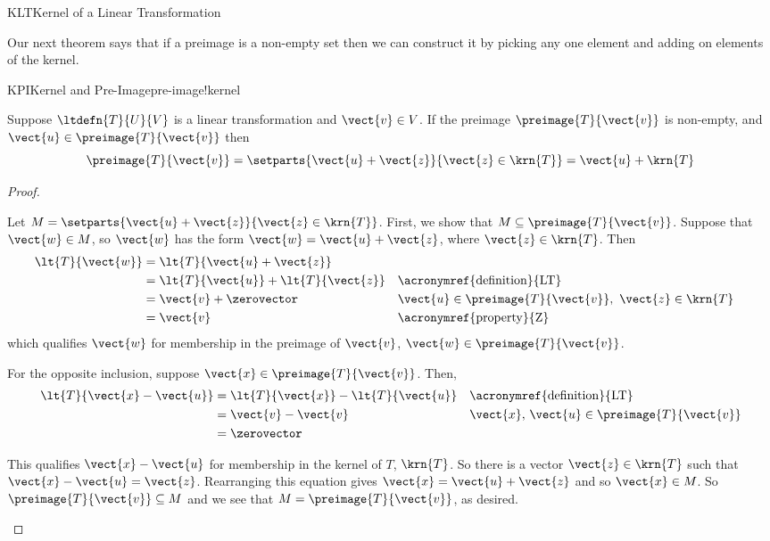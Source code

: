 \begin{subsect}{KLT}{Kernel of a Linear Transformation}
%
%
%
\begin{para}Our next theorem says that if a preimage is a non-empty set then we can construct it by picking any one element and adding on elements of the kernel.\end{para}
%
\begin{theorem}{KPI}{Kernel and Pre-Image}{pre-image!kernel}
\begin{para}Suppose $\ltdefn{T}{U}{V}$ is a linear transformation and $\vect{v}\in V$.  If the preimage $\preimage{T}{\vect{v}}$ is non-empty, and $\vect{u}\in\preimage{T}{\vect{v}}$  then
%
\begin{equation*}
\preimage{T}{\vect{v}}=
\setparts{\vect{u}+\vect{z}}{\vect{z}\in\krn{T}}
=\vect{u}+\krn{T}
\end{equation*}
\end{para}
%
\end{theorem}
%
\begin{proof}
\begin{para}Let $M=\setparts{\vect{u}+\vect{z}}{\vect{z}\in\krn{T}}$.  First, we show that $M\subseteq\preimage{T}{\vect{v}}$.  Suppose that $\vect{w}\in M$, so $\vect{w}$ has the form $\vect{w}=\vect{u}+\vect{z}$, where $\vect{z}\in\krn{T}$.  Then
%
\begin{align*}
\lt{T}{\vect{w}}&=\lt{T}{\vect{u}+\vect{z}}\\
&=\lt{T}{\vect{u}}+\lt{T}{\vect{z}}&&\text{\acronymref{definition}{LT}}\\
&=\vect{v}+\zerovector&&\vect{u}\in\preimage{T}{\vect{v}},\ \vect{z}\in\krn{T}\\
&=\vect{v}&&\text{\acronymref{property}{Z}}
\end{align*}
%
which qualifies $\vect{w}$ for membership in the preimage of $\vect{v}$, $\vect{w}\in\preimage{T}{\vect{v}}$.\end{para}
%
\begin{para}For the opposite inclusion, suppose $\vect{x}\in\preimage{T}{\vect{v}}$.  Then,
%
\begin{align*}
\lt{T}{\vect{x}-\vect{u}}&=\lt{T}{\vect{x}}-\lt{T}{\vect{u}}&&\text{\acronymref{definition}{LT}}\\
&=\vect{v}-\vect{v}&&\vect{x},\,\vect{u}\in\preimage{T}{\vect{v}}\\
&=\zerovector
\end{align*}
\end{para}
%
\begin{para}This qualifies $\vect{x}-\vect{u}$ for membership in the kernel of $T$, $\krn{T}$.  So there is a vector $\vect{z}\in\krn{T}$ such that $\vect{x}-\vect{u}=\vect{z}$.  Rearranging this equation gives $\vect{x}=\vect{u}+\vect{z}$ and so $\vect{x}\in M$.  So $\preimage{T}{\vect{v}}\subseteq M$ and we see that $M=\preimage{T}{\vect{v}}$, as desired.\end{para}

\end{proof}
\end{subsect}
